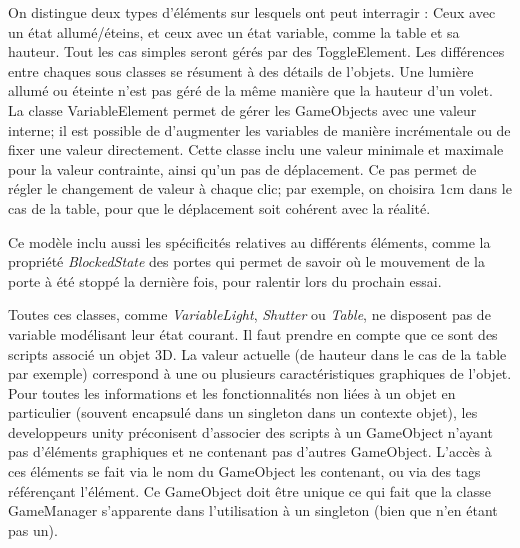 On distingue deux types d'éléments sur lesquels ont peut interragir : Ceux avec un état allumé/éteins, et ceux avec un état variable, comme la table et sa hauteur.
Tout les cas simples seront gérés par des ToggleElement. Les différences entre chaques sous classes se résument à des détails de l'objets.
Une lumière allumé ou éteinte n'est pas géré de la même manière que la hauteur d'un volet.
La classe VariableElement permet de gérer les GameObjects avec une valeur interne; il est possible de d'augmenter les variables de manière incrémentale ou de fixer une valeur directement.
Cette classe inclu une valeur minimale et maximale pour la valeur contrainte, ainsi qu'un pas de déplacement.
Ce pas permet de régler le changement de valeur à chaque clic; par exemple, on choisira 1cm dans le cas de la table, pour que le déplacement soit cohérent avec la réalité.

Ce modèle inclu aussi les spécificités relatives au différents éléments, comme la propriété \textit{BlockedState} des portes qui permet de savoir où le mouvement de la porte à été stoppé la dernière fois, pour ralentir lors du prochain essai.

Toutes ces classes, comme \textit{VariableLight}, \textit{Shutter} ou \textit{Table},  ne disposent pas de variable modélisant leur état courant. 
Il faut prendre en compte que ce sont des scripts associé un objet 3D. 
La valeur actuelle (de hauteur dans le cas de la table par exemple) correspond à une ou plusieurs caractéristiques graphiques de l'objet.
\newline
Pour toutes les informations et les fonctionnalités non liées à un objet en particulier (souvent encapsulé dans un singleton dans un contexte objet), les developpeurs unity préconisent d'associer des scripts à un GameObject n'ayant pas d'éléments graphiques et ne contenant pas d'autres GameObject.
L'accès à ces éléments se fait via le nom du GameObject les contenant, ou via des tags référençant l'élément. Ce GameObject doit être unique ce qui fait que la classe GameManager s'apparente dans l'utilisation à un singleton (bien que n'en étant pas un). 
